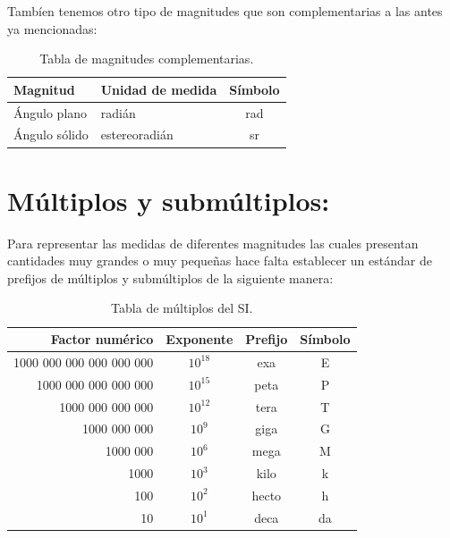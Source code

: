 \documentclass[a5paper,pagesize,10pt,bibtotoc,pointlessnumbers,
normalheadings,DIV=9,fleqn,x11names,table,twoside=false]{scrbook}
\begin{document}
Tambíen tenemos otro tipo de magnitudes que son complementarias a las antes ya mencionadas:

\begin{table}[h]
 \begin{center}
 \begin{tabular}{llc}
 \hline
Magnitud & Unidad de medida & Símbolo\\
\hline
Ángulo plano & radián & rad\\
Ángulo sólido & estereoradián & sr\\
\hline
 \end{tabular}
 \caption{Tabla de magnitudes complementarias.}
 \end{center}
\end{table}

\section{Múltiplos y submúltiplos:}

Para representar las medidas de diferentes magnitudes las cuales presentan cantidades muy grandes o muy pequeñas hace falta 
establecer un estándar de prefijos de múltiplos y submúltiplos de la siguiente manera:

\begin{table}[h]
 \begin{center}
\begin{tabular}{rccc}
\hline
Factor numérico & Exponente & Prefijo & Símbolo\\
\hline
1000 000 000 000 000 000 & $10^{18}$ & exa & E\\
1000 000 000 000 000 & $10^{15}$ & peta & P\\
1000 000 000 000 & $10^{12}$ & tera & T\\
1000 000 000 & $10^{9}$ & giga & G\\
1000 000 & $10^{6}$ & mega  & M\\
1000 &$10^{3}$ & kilo & k\\
100 & $10^{2}$ & hecto & h\\
10 & $10^{1}$  & deca & da\\
\hline
\end{tabular}
\caption{Tabla de múltiplos del SI.}
 \end{center}
\end{table}
 
\end{document}
